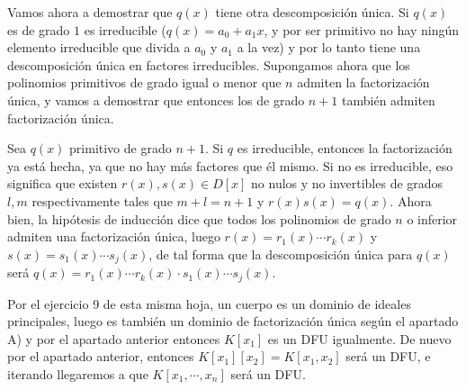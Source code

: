 \begin{problem}[4]
Vamos ahora a demostrar que $q(x)$ tiene otra descomposición única. Si $q(x)$ es de grado $1$ es irreducible ($q(x) = a_0 + a_1 x$, y por ser primitivo no hay ningún elemento irreducible que divida a $a_0$ y $a_1$ a la vez) y por lo tanto tiene una descomposición única en factores irreducibles. Supongamos ahora que los polinomios primitivos de grado igual o menor que $n$ admiten la factorización única, y vamos a demostrar que entonces los de grado $n + 1$ también admiten factorización única.

Sea $q(x)$ primitivo de grado $n + 1$. Si $q$ es irreducible, entonces la factorización ya está hecha, ya que no hay más factores que él mismo. Si no es irreducible, eso significa que existen $r(x), s(x) ∈ D[x]$ no nulos y no invertibles de grados $l,m$ respectivamente tales que $m + l = n + 1$ y $r(x) s(x) = q(x)$. Ahora bien, la hipótesis de inducción dice que todos los polinomios de grado $n$ o inferior admiten una factorización única, luego $r(x) = r_1(x) \dotsb r_k(x)$ y $s(x) = s_1(x) \dotsb s_j(x)$, de tal forma que la descomposición única para $q(x)$ será $q(x) = r_1(x) \dotsb r_k (x) · s_1(x) \dotsb s_j(x)$.

\spart

Por el ejercicio 9 de esta misma hoja, un cuerpo es un dominio de ideales principales, luego es también un dominio de factorización única según el apartado A) y por el apartado anterior entonces $K[x_1]$ es un DFU igualmente. De nuevo por el apartado anterior, entonces $K[x_1][x_2] = K[x_1, x_2]$ será un DFU, e iterando llegaremos a que $K[x_1, \dotsb, x_n]$ será un DFU.

\end{problem}
